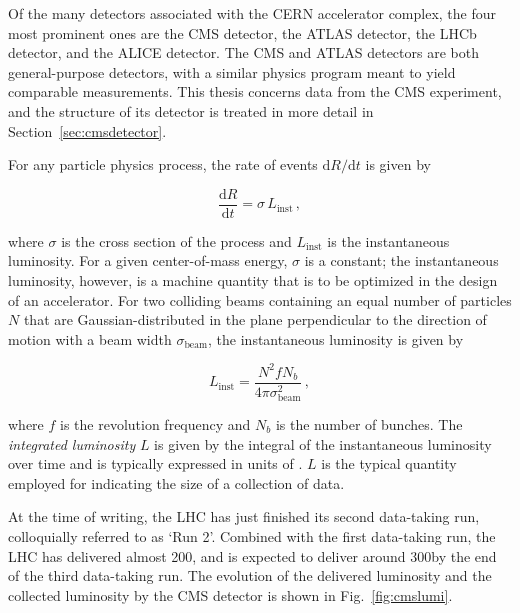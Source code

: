 Of the many detectors associated with the CERN accelerator complex, the four most prominent ones are the CMS detector, the ATLAS detector, the LHCb detector, and the ALICE detector.
% 
The CMS and ATLAS detectors are both general-purpose detectors, with a similar physics program meant to yield comparable measurements.
% 
This thesis concerns data from the CMS experiment, and the structure of its detector is treated in more detail in Section~\ref{sec:cmsdetector}.


For any particle physics process, the rate of events $\mathrm{d}R/\mathrm{d}t$ is given by
% 
\begin{linenomath*}
\begin{equation}
\frac{\mathrm{d}R}{\mathrm{d}t} = \sigma \, L_\text{inst}
\,,
\end{equation}
\end{linenomath*}
% 
where $\sigma$ is the cross section of the process and $L_\text{inst}$ is the instantaneous luminosity.
% 
For a given center-of-mass energy, $\sigma$ is a constant; the instantaneous luminosity, however, is a machine quantity that is to be optimized in the design of an accelerator.
% 
For two colliding beams containing an equal number of particles $N$ that are Gaussian-distributed in the plane perpendicular to the direction of motion with a beam width $\sigma_\text{beam}$, the instantaneous luminosity is given by~\cite{griffiths}
% 
\begin{linenomath*}
\begin{equation}
L_\text{inst} =
\frac{
    N^2 f N_b 
    }{
    4 \pi \sigma_\text{beam}^2
    }
\,,
\end{equation}
\end{linenomath*}
% 
where $f$ is the revolution frequency and $N_b$ is the number of bunches.
% 
The \textit{integrated luminosity} $L$ is given by the integral of the instantaneous luminosity over time and is typically expressed in units of \fbinv.
% 
$L$ is the typical quantity employed for indicating the size of a collection of data.


At the time of writing, the LHC has just finished its second data-taking run, colloquially referred to as `Run 2'.
% 
Combined with the first data-taking run, the LHC has delivered almost 200\fbinv, and is expected to deliver around 300\fbinv by the end of the third data-taking run.
% 
The evolution of the delivered luminosity and the collected luminosity by the CMS detector is shown in Fig.~\ref{fig:cmslumi}.

